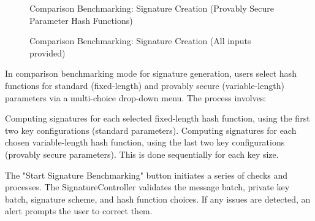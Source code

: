 \documentclass[]{final_report}
\theoremstyle{definition}
\begin{document}
\begin{figure}[H]
\begin{minipage}{0.49\textwidth}
        \caption{Comparison Benchmarking: Signature Creation (Provably Secure Parameter Hash Functions)}
        \label{fig:image2}
    \end{minipage}
      \begin{minipage}{0.55\textwidth}
        \centering
        \caption{Comparison Benchmarking: Signature Creation (All inputs provided)}
        \label{fig:image2}
    \end{minipage}
\end{figure}

In comparison benchmarking mode for signature generation, users select hash functions for standard (fixed-length) and provably secure (variable-length) parameters via a multi-choice drop-down menu. The process involves:

Computing signatures for each selected fixed-length hash function, using the first two key configurations (standard parameters).
Computing signatures for each chosen variable-length hash function, using the last two key configurations (provably secure parameters). This is done sequentially for each key size.

The "Start Signature Benchmarking" button initiates a series of checks and processes. The SignatureController validates the message batch, private key batch, signature scheme, and hash function choices. If any issues are detected, an alert prompts the user to correct them.
\end{document}
